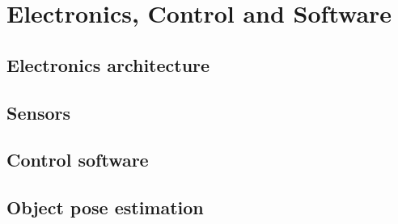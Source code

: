 \chapter{Electronics, Control and Software}
\label{ch:electronics_software}
\section{Electronics architecture}

\section{Sensors}

\section{Control software}

\section{Object pose estimation}
